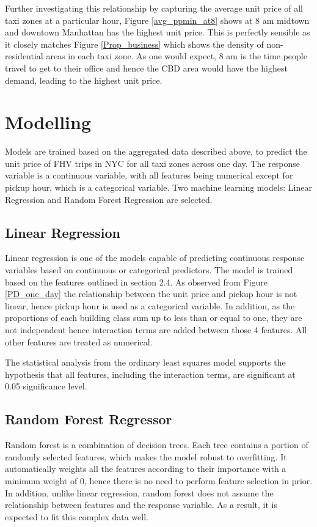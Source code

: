 \documentclass[11pt]{article}
\begin{document}
Further investigating this relationship by capturing the average unit price of all taxi zones at a particular hour, Figure \ref{avg_ppmin_at8} shows at 8 am midtown and downtown Manhattan has the highest unit price. This is perfectly sensible as it closely matches Figure \ref{Prop_business} which shows the density of non-residential areas in each taxi zone. As one would expect, 8 am is the time people travel to get to their office and hence the CBD area would have the highest demand, leading to the highest unit price. 


\section{Modelling}
Models are trained based on the aggregated data described above, to predict the unit price of FHV trips in NYC for all taxi zones across one day. The response variable is a continuous variable, with all features being numerical except for pickup hour, which is a categorical variable. Two machine learning models: Linear Regression and Random Forest Regression are selected.

\subsection{Linear Regression}
Linear regression is one of the models capable of predicting continuous response variables based on continuous or categorical predictors. The model is trained based on the features outlined in section 2.4. As observed from Figure \ref{PD_one_day} the relationship between the unit price and pickup hour is not linear, hence pickup hour is used as a categorical variable. In addition, as the proportions of each building class sum up to less than or equal to one, they are not independent hence interaction terms are added between those 4 features. All other features are treated as numerical. 

The statistical analysis from the ordinary least squares model supports the hypothesis that all features, including the interaction terms, are significant at 0.05 significance level. 

\subsection{Random Forest Regressor}
Random forest is a combination of decision trees. Each tree contains a portion of randomly selected features, which makes the model robust to overfitting. It automatically weights all the features according to their importance with a minimum weight of 0, hence there is no need to perform feature selection in prior. In addition, unlike linear regression, random forest does not assume the relationship between features and the response variable. As a result, it is expected to fit this complex data well. 
\end{document}
